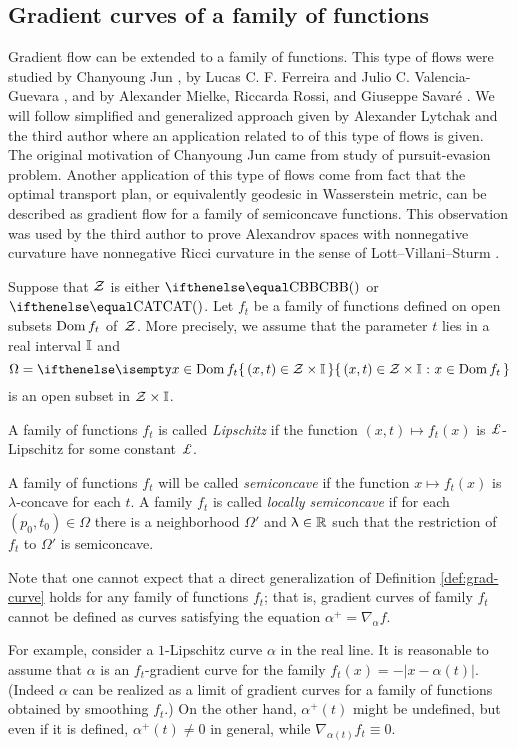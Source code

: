 \subsection*{Gradient curves of a family of functions}

Gradient flow can be extended to a family of functions.
This type of flows were studied by Chanyoung Jun \cite{jun-thesis,jun:grad}, by Lucas C. F. Ferreira and Julio C. Valencia-Guevara \cite{ferreira-valencia}, and by Alexander Mielke, Riccarda Rossi, and Giuseppe Savar\'{e} \cite{mielke-rossi-savare}.
We will follow simplified and generalized approach given by Alexander Lytchak and the third author \cite{lytchak-petrunin-2020} where an application related to of this type of flows is given.
The original motivation of Chanyoung Jun came from study of pursuit-evasion problem.
Another application of this type of flows come from fact that
 the optimal transport plan, or equivalently geodesic in Wasserstein metric, can be described as gradient flow for a family of semiconcave functions.
This observation was used by the third author to prove Alexandrov spaces with nonnegative curvature have nonnegative Ricci curvature in the sense of Lott--Villani--Sturm \cite{petrunin:optimal}.

Suppose that $\mathcal{Z}$ is either $\Alex{}$ or $\CAT{}$.
Let $f_t$ be a family of functions defined on open subsets $\mathop{\rm Dom}\nolimits f_t$ of~$\mathcal{Z}$.
More precisely, we assume that the parameter $t$ lies in a real interval $\mathbb{I}$ and 
\[\Omega=\set{(x,t)\in\spc{Z}\times \II}{x\in\Dom f_t}\]
is an open subset in $\spc{Z}\times \II$.

A family of functions $f_t$ is called \emph{Lipschitz} if 
the function $(x,t)\mapsto f_t(x)$ is $\Lip$-Lipschitz for some constant $\Lip$.

A family of functions $f_t$ will be called \emph{semiconcave} if 
the function $x\mapsto f_t(x)$ is $\lambda$-concave for each $t$.
A family $f_t$ is called \emph{locally semiconcave} if for each $(p_0,t_0)\in \Omega$ there is a neighborhood $\Omega'$ and $\lambda\in\RR$ such that the restriction of $f_t$ to $\Omega'$ is semiconcave. 

Note that one cannot expect that a direct generalization of Definition \ref{def:grad-curve} holds for any family of functions $f_t$; that is, gradient curves of family $f_t$ cannot be defined as curves satisfying the equation $\alpha^+=\nabla_{\alpha} f$.

For example, consider a $1$-Lipschitz curve $\alpha$ in the real line. 
It is reasonable to assume that $\alpha$ is an $f_t$-gradient curve for the family $f_t(x)=-|x-\alpha(t)|$.
(Indeed $\alpha$ can be realized as a limit of  gradient curves for a family of functions obtained by smoothing $f_t$.)
On the other hand, $\alpha^+(t)$ might be undefined,
but even if it is defined, $\alpha^+(t)\ne0$ in general, while $\nabla_{\alpha(t)} f_t\equiv0$.


